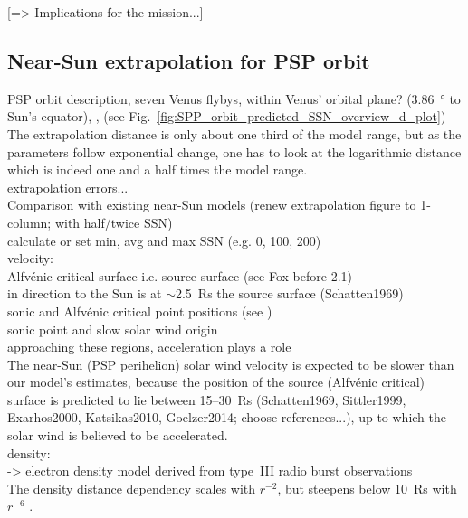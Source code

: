 [=> Implications for the mission...]\\

\subsection{Near-Sun extrapolation for PSP orbit}

PSP orbit description, seven Venus flybys, within Venus' orbital plane? (\SI{3.86}{\degree} to Sun's equator), \citep{Fox2015}, (see Fig.~\ref{fig:SPP_orbit_predicted_SSN_overview_d_plot})\\

The extrapolation distance is only about one third of the model range, but as the parameters follow exponential change, one has to look at the logarithmic distance which is indeed one and a half times the model range.\\

extrapolation errors...\\
Comparison with existing near-Sun models (renew extrapolation figure to 1-column; with half/twice SSN)\\
calculate or set min, avg and max SSN (e.g. 0, 100, 200)\\

velocity:\\
Alfvénic critical surface i.e. source surface (see Fox before 2.1)\\
in direction to the Sun is at $\sim$2.5~Rs the source surface (Schatten1969)\\
sonic and Alfvénic critical point positions (see \citet{Sittler1999})\\
sonic point and slow solar wind origin \citep{Sheeley1997}\\
approaching these regions, acceleration plays a role\\

The near-Sun (PSP perihelion) solar wind velocity is expected to be slower than our model's estimates, because the position of the source (Alfvénic critical) surface is predicted to lie between 15--30~Rs (Schatten1969, Sittler1999, Exarhos2000, Katsikas2010, Goelzer2014; choose references...), up to which the solar wind is believed to be accelerated.\\

density:\\
\citet{Leblanc1998} -> electron density model derived from type~III radio burst observations\\
The density distance dependency scales with $r^{-2}$, but steepens below 10~Rs with $r^{-6}$ \citep{Leblanc1998}.\\

